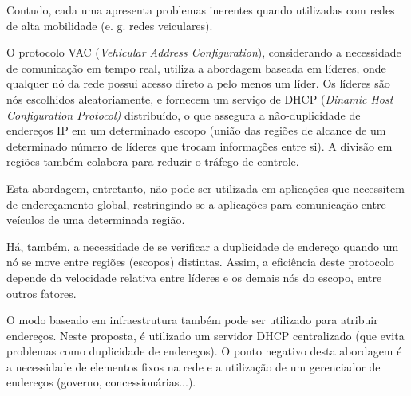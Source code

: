 \documentclass[12pt,twoside,a4paper]{article}
\begin{document}
Contudo, cada uma apresenta problemas inerentes quando utilizadas com redes de alta mobilidade (e. g. redes veiculares).

O protocolo VAC (\textit{Vehicular Address Configuration}), considerando a necessidade de comunicação em tempo real, utiliza a abordagem baseada em líderes, onde qualquer nó da rede possui acesso direto a pelo menos um líder. Os líderes são nós escolhidos aleatoriamente, e fornecem um serviço de DHCP (\textit{Dinamic Host Configuration Protocol)} distribuído, o que assegura a não-duplicidade de endereços IP em um determinado escopo (união das
regiões de alcance de um determinado número de líderes que trocam informações entre
si). A divisão em regiões também colabora para reduzir o tráfego de controle.

Esta abordagem, entretanto, não pode ser utilizada em aplicações que necessitem de endereçamento global, restringindo-se a aplicações para comunicação entre veículos de uma determinada região.

Há, também, a necessidade de se verificar a duplicidade de endereço quando um nó se move entre regiões (escopos) distintas. Assim, a eficiência deste protocolo depende da velocidade relativa entre líderes e os demais nós do escopo, entre outros fatores.

O modo baseado em infraestrutura também pode ser utilizado para atribuir endereços. Neste proposta, é utilizado um servidor DHCP centralizado (que evita problemas como duplicidade de endereços). O ponto negativo desta abordagem é a necessidade de elementos fixos na rede e a utilização de um gerenciador de endereços (governo, concessionárias...).




\end{document}
